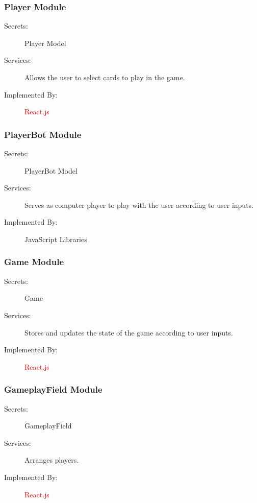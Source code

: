 \documentclass[12pt, titlepage]{article}
\begin{document}
\subsubsection{Player Module}

\begin{description}
\item[Secrets:] Player Model
\item[Services:] Allows the user to select cards to play in the game.
\item[Implemented By:] \textcolor{red}{React.js}
\end{description}

\subsubsection{PlayerBot Module}

\begin{description}
\item[Secrets:] PlayerBot Model
\item[Services:] Serves as computer player to play with the user according to user inputs.
\item[Implemented By:] JavaScript Libraries
\end{description}

\subsubsection{Game Module}

\begin{description}
\item[Secrets:] Game
\item[Services:] Stores and updates the state of the game according to user inputs.
\item[Implemented By:] \textcolor{red}{React.js}
\end{description}

\subsubsection{GameplayField Module}

\begin{description}
\item[Secrets:] GameplayField
\item[Services:] Arranges players.
\item[Implemented By:] \textcolor{red}{React.js}
\end{description}
\end{document}
